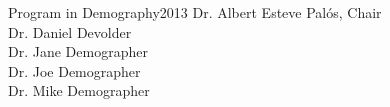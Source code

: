 






{Program in Demography}{2013}
{Dr. Albert Esteve Pal\'{o}s, Chair\\
 Dr. Daniel Devolder\\
 Dr. Jane Demographer\\
 Dr. Joe Demographer\\
 Dr. Mike Demographer}

\initializefrontsections



\makeatletter
\if@twoside \setcounter{page}{4} \else \setcounter{page}{1} \fi
\makeatother
 

\startacknowledgementspage

\label{Acknowledgements}

%

\tableofcontents     %
\listoffigures       %

